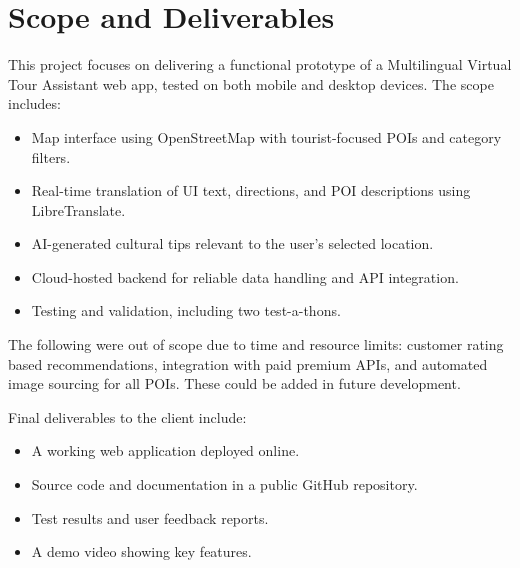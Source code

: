 \section{Scope and Deliverables}
This project focuses on delivering a functional prototype of a Multilingual Virtual Tour Assistant web app, tested on both mobile and desktop devices. The scope includes:
\begin{itemize}
\item Map interface using OpenStreetMap with tourist-focused POIs and category filters.
\item Real-time translation of UI text, directions, and POI descriptions using LibreTranslate.
\item AI-generated cultural tips relevant to the user’s selected location.
\item Cloud-hosted backend for reliable data handling and API integration.
\item Testing and validation, including two test-a-thons.
\end{itemize}

The following were out of scope due to time and resource limits: customer rating based recommendations, integration with paid premium APIs, and automated image sourcing for all POIs. These could be added in future development.

Final deliverables to the client include:
\begin{itemize}
\item A working web application deployed online.
\item Source code and documentation in a public GitHub repository.
\item Test results and user feedback reports.
\item A demo video showing key features.
\end{itemize}